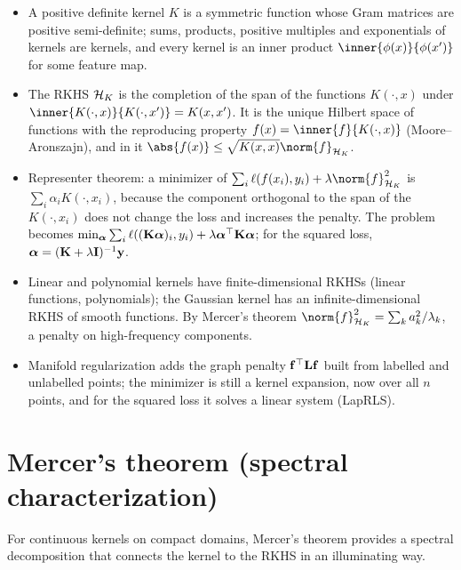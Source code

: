 \begin{notechapter}
\begin{enumerate}[label=\emph{Q\arabic*.}, leftmargin=*, itemsep=10pt]
\end{enumerate}

\begin{chaptersummary}
\begin{itemize}
\item A positive definite kernel $K$ is a symmetric function whose Gram matrices are positive semi-definite; sums, products, positive multiples and exponentials of kernels are kernels, and every kernel is an inner product $\inner{\phi(x)}{\phi(x')}$ for some feature map.
\item The RKHS $\mathcal{H}_K$ is the completion of the span of the functions $K(\cdot, x)$ under $\inner{K(\cdot,x)}{K(\cdot,x')} = K(x,x')$. It is the unique Hilbert space of functions with the reproducing property $f(x) = \inner{f}{K(\cdot,x)}$ (Moore--Aronszajn), and in it $\abs{f(x)} \le \sqrt{K(x,x)}\norm{f}_{\hk}$.
\item Representer theorem: a minimizer of $\sum_i\ell(f(x_i),y_i) + \lambda\norm{f}_{\hk}^2$ is $\sum_i\alpha_iK(\cdot,x_i)$, because the component orthogonal to the span of the $K(\cdot,x_i)$ does not change the loss and increases the penalty. The problem becomes $\min_{\boldsymbol{\alpha}}\sum_i\ell((\mathbf{K}\boldsymbol{\alpha})_i,y_i) + \lambda\boldsymbol{\alpha}^\top\mathbf{K}\boldsymbol{\alpha}$; for the squared loss, $\boldsymbol{\alpha} = (\mathbf{K} + \lambda\mathbf{I})^{-1}\mathbf{y}$.
\item Linear and polynomial kernels have finite-dimensional RKHSs (linear functions, polynomials); the Gaussian kernel has an infinite-dimensional RKHS of smooth functions. By Mercer's theorem $\norm{f}_{\hk}^2 = \sum_ka_k^2/\lambda_k$, a penalty on high-frequency components.
\item Manifold regularization adds the graph penalty $\mathbf{f}^\top\mathbf{L}\mathbf{f}$ built from labelled and unlabelled points; the minimizer is still a kernel expansion, now over all $n$ points, and for the squared loss it solves a linear system (LapRLS).
\end{itemize}
\end{chaptersummary}

\chapterappendix

\section{Mercer's theorem (spectral characterization)}
\label{rkhs:sec:mercer}

For continuous kernels on compact domains, Mercer's theorem provides a
spectral decomposition that connects the kernel to the RKHS in an
illuminating way.


\end{notechapter}
